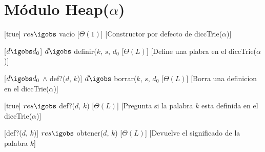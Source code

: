 \section{M\'{o}dulo Heap($\alpha$)}

\begin{Interfaz}
  
  \begin{paramFormales}
    \paramGeneros{$\alpha$}



  \end{paramFormales}




    [true]
    {$res \igobs$ vac\'{i}o}
    [$\Theta(1)$]
    [Constructor por defecto de diccTrie($\alpha$)]

    [$d \igobs d_{0}$]
    {$d \igobs$ definir($k$, $s$, $d_{0}$}
    [$\Theta(L)$]
    [Define una plabra en el diccTrie($\alpha$)]

    [$d \igobs d_{0}$ $\land$ def?($d$, $k$)]
    {$d \igobs$ borrar($k$, $s$, $d_{0}$}
    [$\Theta(L)$]
    [Borra una definicion en el diccTrie($\alpha$)]

    [true]
    {$res \igobs$ def?($d$, $k$)}
    [$\Theta(L)$]
    [Pregunta si la palabra $k$ esta definida en el diccTrie($\alpha$)]

    [def?($d$, $k$)]
    {$res \igobs$ obtener($d$, $k$)}
    [$\Theta(L)$]
    [Devuelve el significado de la palabra $k$]

\end{Interfaz}
